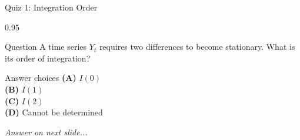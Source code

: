 \documentclass[9pt, aspectratio=169, t]{beamer}
\begin{document}
\begin{frame}{Quiz 1: Integration Order}
    \begin{cminipage}{0.95\textwidth}
    \begin{alertblock}{Question}
        A time series $Y_t$ requires two differences to become stationary. What is its order of integration?
    \end{alertblock}

    \vspace{0.4cm}

    \begin{block}{Answer choices}
        \textcolor{MainBlue}{\textbf{(A)}} $I(0)$\\[3pt]
        \textcolor{MainBlue}{\textbf{(B)}} $I(1)$\\[3pt]
        \textcolor{MainBlue}{\textbf{(C)}} $I(2)$\\[3pt]
        \textcolor{MainBlue}{\textbf{(D)}} Cannot be determined
    \end{block}

    \vspace{0.5cm}

    \begin{center}
        \textit{Answer on next slide...}
    \end{center}
    \end{cminipage}
\end{frame}
\end{document}
